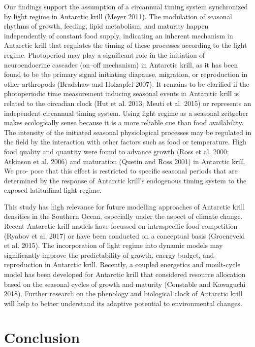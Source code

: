 Our findings support the assumption of a circannual timing system synchronized
by light regime in Antarctic krill (Meyer 2011). The modulation of seasonal
rhythms of growth, feeding, lipid metabolism, and maturity happen independently
of constant food supply, indicating an inherent mechanism in Antarctic krill
that regulates the timing of these processes according to the light regime.
Photoperiod may play a significant role in the initiation of neuroendocrine
cascades (on–off mechanism) in Antarctic krill, as it has been found to be the
primary signal initiating diapause, migration, or reproduction in other
arthropods (Bradshaw and Holzapfel 2007). It remains to be clarified if the
photoperiodic time measurement inducing seasonal events in Antarctic krill is
related to the circadian clock (Hut et al. 2013; Meuti et al. 2015) or
represents an independent circannual timing system. Using light regime as a
seasonal zeitgeber makes ecologically sense because it is a more reliable cue
than food availability. The intensity of the initiated seasonal physiological
processes may be regulated in the field by the interaction with other factors
such as food or temperature. High food quality and quantity were found to
advance growth (Ross et al. 2000; Atkinson et al. 2006) and maturation (Quetin
and Ross 2001) in Antarctic krill. We pro- pose that this effect is restricted
to specific seasonal periods that are determined by the response of Antarctic
krill’s endogenous timing system to the exposed latitudinal light regime. 

This study has high relevance for future modelling approaches of Antarctic
krill densities in the Southern Ocean, especially under the aspect of climate
change. Recent Antarctic krill models have focussed on intraspecific food
competition (Ryabov et al. 2017) or have been conducted on a conceptual basis
(Groeneveld et al. 2015). The incorporation of light regime into dynamic models
may significantly improve the predictability of growth, energy budget, and
reproduction in Antarctic krill. Recently, a coupled energetics and moult-cycle
model has been developed for Antarctic krill that considered resource
allocation based on the seasonal cycles of growth and maturity (Constable and
Kawaguchi 2018). Further research on the phenology and biological clock of
Antarctic krill will help to better understand its adaptive potential to
environmental changes. 

\section{Conclusion}

